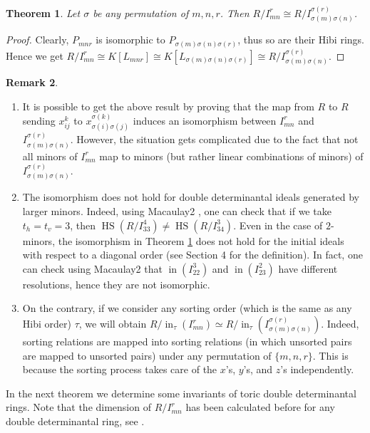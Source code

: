 \documentclass[12pt]{amsart}
\numberwithin{equation}{section}
\newtheorem{theorem}{Theorem}[section]
\theoremstyle{definition}
\newtheorem{remark}[theorem]{Remark}
\DeclareMathOperator{\ini}{in}
\DeclareMathOperator{\HS}{HS}
\begin{document}
\begin{theorem}
\label{thm: isomorphism}
Let $\sigma$ be any permutation of $m,n,r$.
Then $R/I_{mn}^r\cong R/I_{\sigma(m)\sigma(n)}^
{\sigma(r)}$.
\end{theorem}
\begin{proof}
  Clearly, $P_{mnr}$ is isomorphic to $P_{\sigma(m)\sigma(n)\sigma(r)}$, thus so are their Hibi rings. Hence we get $R/I_{mn}^r\cong K[L_{mnr}]\cong K[L_{\sigma(m)\sigma(n)\sigma(r)}]\cong R/I_{\sigma(m)\sigma(n)}^
{\sigma(r)}$. 
\end{proof}
\begin{remark}
 \begin{enumerate}
\item  It is possible to get the above result by proving that the map from $R$ to $R$  sending $x_{ij}^k$ to $x_{\sigma(i)\sigma(j)}^
{\sigma(k)}$ induces an isomorphism between $I_{mn}^r$ and $I_{\sigma(m)\sigma(n)}^
{\sigma(r)}$.  However, the situation gets complicated due to the fact that not all minors of $I_{mn}^r$ map to minors (but rather linear combinations of minors) of $I_{\sigma(m)\sigma(n)}^
{\sigma(r)}$.

\item The isomorphism does not hold for double determinantal ideals generated by larger minors. Indeed, using Macaulay2 \cite{M2}, one can check that if we take $t_h=t_v=3$, then $\HS(R/I_{33}^4)\neq\HS(R/I_{34}^3)$.
 Even in the case of $2$-minors, the isomorphism in Theorem \ref{thm: isomorphism} does not hold for the initial ideals with respect to a diagonal order (see Section 4 for the definition).  
 In fact, one can check using Macaulay2 \cite{M2} that $\ini(I_{22}^3)$ and $\ini(I_{23}^2)$ have different resolutions, hence they are not isomorphic.
 \item On the contrary, if we consider any sorting order (which is the same as any Hibi order) $\tau$, we will obtain $R/\ini_{\tau}(I_{mn}^r)\simeq R/\ini_{\tau}(I_{\sigma(m)\sigma(n)}^{\sigma(r)})$. Indeed, sorting relations are mapped into sorting relations (in which unsorted pairs are mapped to unsorted pairs) under any permutation of $\{m,n,r\}$.  This is because the sorting process takes care of the $x$'s, $y$'s, and $z$'s independently. 
 \end{enumerate}
\end{remark}

In the next theorem we determine some invariants of toric double determinantal rings. Note that the dimension of $R/I_{mn}^r$ has been calculated before for any double determinantal ring, see .
\end{document}
